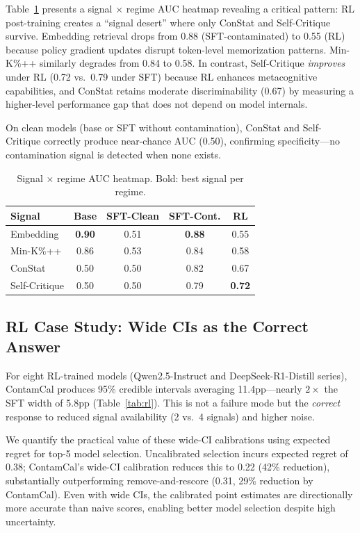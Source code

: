 \documentclass[11pt,letterpaper]{article}
\begin{document}
Table~\ref{tab:signal-regime} presents a signal $\times$ regime AUC heatmap revealing a critical pattern: RL post-training creates a ``signal desert'' where only ConStat and Self-Critique survive.
Embedding retrieval drops from 0.88 (SFT-contaminated) to 0.55 (RL) because policy gradient updates disrupt token-level memorization patterns.
Min-K\%++ similarly degrades from 0.84 to 0.58.
In contrast, Self-Critique \emph{improves} under RL (0.72 vs.\ 0.79 under SFT) because RL enhances metacognitive capabilities, and ConStat retains moderate discriminability (0.67) by measuring a higher-level performance gap that does not depend on model internals.

On clean models (base or SFT without contamination), ConStat and Self-Critique correctly produce near-chance AUC (0.50), confirming specificity---no contamination signal is detected when none exists.

\begin{table}[t]
\centering
\caption{Signal $\times$ regime AUC heatmap. Bold: best signal per regime.}
\label{tab:signal-regime}
\begin{tabular}{lcccc}
\toprule
\textbf{Signal} & \textbf{Base} & \textbf{SFT-Clean} & \textbf{SFT-Cont.} & \textbf{RL} \\
\midrule
Embedding & \textbf{0.90} & 0.51 & \textbf{0.88} & 0.55 \\
Min-K\%++ & 0.86 & 0.53 & 0.84 & 0.58 \\
ConStat & 0.50 & 0.50 & 0.82 & 0.67 \\
Self-Critique & 0.50 & 0.50 & 0.79 & \textbf{0.72} \\
\bottomrule
\end{tabular}
\end{table}

\subsection{RL Case Study: Wide CIs as the Correct Answer}

For eight RL-trained models (Qwen2.5-Instruct and DeepSeek-R1-Distill series), ContamCal produces 95\% credible intervals averaging 11.4pp---nearly $2\times$ the SFT width of 5.8pp (Table~\ref{tab:rl}).
This is not a failure mode but the \emph{correct} response to reduced signal availability (2 vs.\ 4 signals) and higher noise.

We quantify the practical value of these wide-CI calibrations using expected regret for top-5 model selection.
Uncalibrated selection incurs expected regret of 0.38; ContamCal's wide-CI calibration reduces this to 0.22 (42\% reduction), substantially outperforming remove-and-rescore (0.31, 29\% reduction by ContamCal).
Even with wide CIs, the calibrated point estimates are directionally more accurate than naive scores, enabling better model selection despite high uncertainty.
\end{document}
